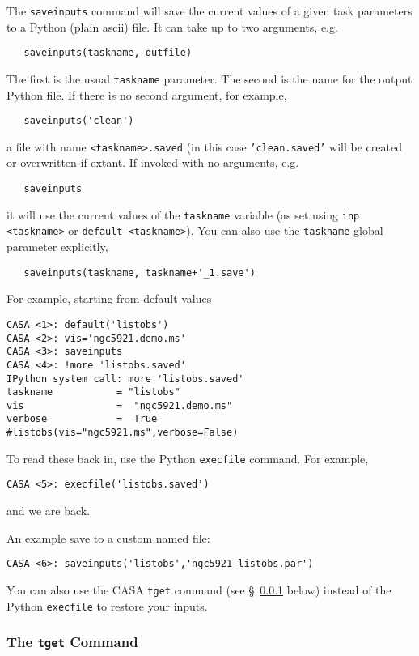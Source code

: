 The {\tt saveinputs} command will save the current values of
a given task parameters to a Python (plain ascii) file.  It
can take up to two arguments, e.g.
\small
\begin{verbatim}
   saveinputs(taskname, outfile)
\end{verbatim}
\normalsize
The first is the usual {\tt taskname} parameter.  
The second is the name for the
output Python file.  If there is no second argument, for example,
\small
\begin{verbatim}
   saveinputs('clean')
\end{verbatim}
\normalsize
a file with name {\tt <taskname>.saved} (in this case 
{\tt 'clean.saved'} will be created or 
overwritten if extant.  If invoked with no arguments, e.g.
\small
\begin{verbatim}
   saveinputs
\end{verbatim}
\normalsize
it will use the current values of the {\tt taskname} variable
(as set using {\tt inp <taskname>} or {\tt default <taskname>}).
You can also use the {\tt taskname} global parameter explicitly,
\small
\begin{verbatim}
   saveinputs(taskname, taskname+'_1.save')
\end{verbatim}
\normalsize

For example, starting from default values
\small
\begin{verbatim}
CASA <1>: default('listobs')
CASA <2>: vis='ngc5921.demo.ms'
CASA <3>: saveinputs
CASA <4>: !more 'listobs.saved' 
IPython system call: more 'listobs.saved'
taskname           = "listobs"
vis                =  "ngc5921.demo.ms"
verbose            =  True
#listobs(vis="ngc5921.ms",verbose=False)
\end{verbatim}
\normalsize
To read these back in, use the Python {\tt execfile} command.  For example,
\small
\begin{verbatim}
CASA <5>: execfile('listobs.saved')
\end{verbatim}
\normalsize
and we are back.

An example save to a custom named file:
\small
\begin{verbatim}
CASA <6>: saveinputs('listobs','ngc5921_listobs.par')
\end{verbatim}
\normalsize

You can also use the CASA {\tt tget} command (see
\S~\ref{section:intro.tasks.setpar.tget} below) instead of the Python
{\tt execfile} to restore your inputs.

\subsubsection{The {\tt tget} Command}
\label{section:intro.tasks.setpar.tget}

